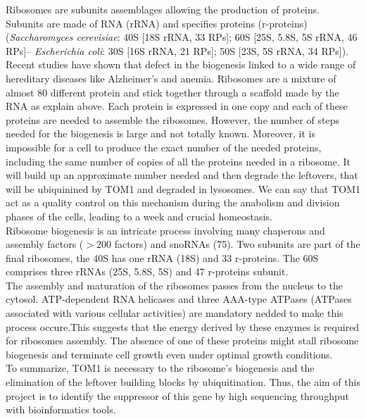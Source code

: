\documentclass[10pt,a4paper]{article}
\begin{document}
\noindent Ribosomes are subunits assemblages allowing the production of proteins. Subunits are made of RNA (rRNA) and specifies proteins (r-proteins) (\textit{Saccharomyces cerevisiae}: 40S [18S rRNA, 33 RPs]; 60S [25S, 5.8S, 5S rRNA, 46 RPs]– \textit{Escherichia coli}: 30S [16S rRNA, 21 RPs]; 50S [23S, 5S rRNA, 34 RPs])\cite{kressler_driving_2010}. Recent studies have shown that defect in the biogenesis linked to a wide range of hereditary diseases like Alzheimer’s and anemia\cite{makioka_immunolocalization_2016}. Ribosomes are a mixture of almost 80 different protein and stick together through a scaffold made by the RNA as explain above. Each protein is expressed in one copy and each of these proteins are needed to assemble the ribosomes. However, the number of steps needed for the biogenesis is large and not totally known. Moreover, it is impossible for a cell to produce the exact number of the needed proteins, including the same number of copies of all the proteins needed in a ribosome\cite{sung_conserved_2016}. It will build up an approximate number needed and then degrade the leftovers, that will be ubiquinined by TOM1 and degraded in lysosomes. We can say that TOM1 act as a quality control on this mechanism during the anabolism and division phases of the cells, leading to a week and crucial homeostasis\cite{sung_conserved_2016}.\\

\noindent Ribosome biogenesis is an intricate process involving many chaperons and assembly factors ($>$200 factors) and snoRNAs (75)\cite{kressler_driving_2010}. Two subunits are part of the final ribosomes, the 40S has one rRNA (18S) and 33 r-proteins. The 60S comprises three rRNAs (25S, 5.8S, 5S) and 47 r-proteins subunit\cite{kressler_driving_2010}.\\


\noindent The assembly and maturation of the ribosomes passes from the nucleus to the cytosol. ATP-dependent RNA helicases and three AAA-type ATPases (ATPases associated with various cellular activities) are mandatory nedded to make this process occure.This suggests that the energy derived by these enzymes is required for ribosomes assembly. The absence of one of these proteins might stall ribosome biogenesis and terminate cell growth even under optimal growth conditions\cite{dinman_eukaryotic_2009,kressler_driving_2010}.\\

\noindent To summarize, TOM1 is necessary to the ribosome’s biogenesis and the elimination of the leftover building blocks by ubiquitination. Thus, the aim of this project is to identify the suppressor of this gene by high sequencing throughput with bioinformatics tools. \\
\end{document}
